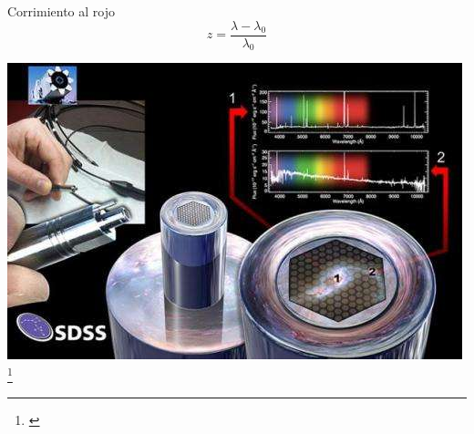\documentclass[handout]{beamer}
\newcommand\blfootnote[1]
{%
	\begingroup
	\renewcommand\thefootnote{}\footnote{#1}%
	\addtocounter{footnote}{-1}%
	\endgroup
}
\newcommand{\fcite}[1]{\blfootnote{\cite{#1}}}
\begin{document}
\begin{frame}{Corrimiento al rojo}
	\begin{equation}
		z = \dfrac{\lambda - \lambda_0}{\lambda_0}
	\end{equation}
\end{frame}

\begin{frame}{}
	\includegraphics[width = 0.5\linewidth]{sources/images/SDSS.jpg}
	\fcite{tegmark2006cosmological}
\end{frame}
\end{document}

